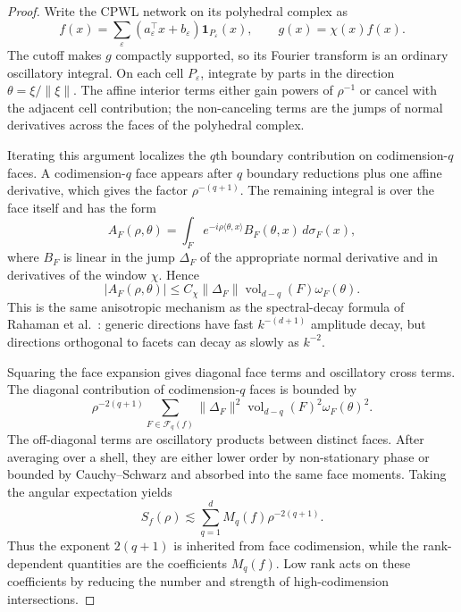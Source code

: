 \documentclass{article}
\begin{document}
\begin{proof}
Write the CPWL network on its polyhedral complex as
\begin{equation}
f(x)=\sum_{\varepsilon}
(a_\varepsilon^\top x+b_\varepsilon)\mathbf 1_{P_\varepsilon}(x),
\qquad
g(x)=\chi(x)f(x).
\end{equation}
The cutoff makes $g$ compactly supported, so its Fourier transform is an ordinary oscillatory integral. On each cell $P_\varepsilon$, integrate by parts in the direction $\theta=\xi/\|\xi\|$. The affine interior terms either gain powers of $\rho^{-1}$ or cancel with the adjacent cell contribution; the non-canceling terms are the jumps of normal derivatives across the faces of the polyhedral complex.

Iterating this argument localizes the $q$th boundary contribution on codimension-$q$ faces. A codimension-$q$ face appears after $q$ boundary reductions plus one affine derivative, which gives the factor $\rho^{-(q+1)}$. The remaining integral is over the face itself and has the form
\begin{equation}
A_F(\rho,\theta)
=
\int_F e^{-i\rho\langle \theta,x\rangle}
B_F(\theta,x)\,d\sigma_F(x),
\end{equation}
where $B_F$ is linear in the jump $\Delta_F$ of the appropriate normal derivative and in derivatives of the window $\chi$. Hence
\begin{equation}
|A_F(\rho,\theta)|
\le
C_\chi\|\Delta_F\|
\operatorname{vol}_{d-q}(F)\omega_F(\theta).
\end{equation}
This is the same anisotropic mechanism as the spectral-decay formula of Rahaman et al.~\citep{rahaman2019}: generic directions have fast $k^{-(d+1)}$ amplitude decay, but directions orthogonal to facets can decay as slowly as $k^{-2}$.

Squaring the face expansion gives diagonal face terms and oscillatory cross terms. The diagonal contribution of codimension-$q$ faces is bounded by
\begin{equation}
\rho^{-2(q+1)}
\sum_{F\in\mathcal F_q(f)}
\|\Delta_F\|^2
\operatorname{vol}_{d-q}(F)^2
\omega_F(\theta)^2 .
\end{equation}
The off-diagonal terms are oscillatory products between distinct faces. After averaging over a shell, they are either lower order by non-stationary phase or bounded by Cauchy--Schwarz and absorbed into the same face moments. Taking the angular expectation yields
\begin{equation}
S_f(\rho)\lesssim
\sum_{q=1}^d
M_q(f)\rho^{-2(q+1)}.
\end{equation}
Thus the exponent $2(q+1)$ is inherited from face codimension, while the rank-dependent quantities are the coefficients $M_q(f)$. Low rank acts on these coefficients by reducing the number and strength of high-codimension intersections.
\end{proof}
\end{document}
